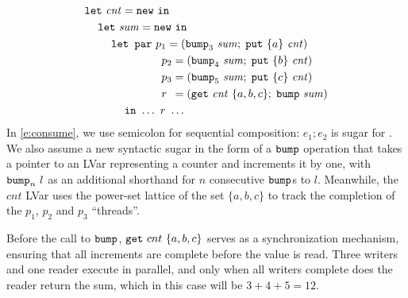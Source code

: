 \begin{equation}\label{e:consume}
\begin{split}
& \letexp{\mathit{cnt}}{\NEW}{ \\
& \letspace \letexp{\mathit{sum}}{\NEW}{ \\
& \letspace \letspace \LETPAR      ~p_1 = (\BUMP_3~{\mathit{sum}};\; \PUT ~ \{a\} ~ \mathit{cnt})\\
& \letspace \letspace \letparspace ~p_2 = (\BUMP_4~{\mathit{sum}};\; \PUT ~ \{b\} ~ \mathit{cnt})\\
& \letspace \letspace \letparspace ~p_3 = (\BUMP_5~{\mathit{sum}};\; \PUT ~ \{c\} ~ \mathit{cnt})\\
& \letspace \letspace \letparspace ~r  \hspace{0.47em} = (\getexp{\mathit{cnt}}\{a,b,c\};\; \bumpexp{\mathit{sum}})\\
& \letspace \letspace \letspace \IN~ \dots~r~\dots
}}
\end{split}
\end{equation}
In \eqref{e:consume},
we use semicolon for sequential composition: $e_1; e_2$ is sugar for .
We also assume a new syntactic sugar in
the form of a $\mbox{\texttt{bump}}$ operation that takes a pointer to an LVar representing a counter and increments it by one,
with $\mbox{\texttt{bump}}_n~l$ as an additional shorthand for $n$ consecutive
$\mbox{\texttt{bump}}$s to $l$.
Meanwhile, the $\mathit{cnt}$ LVar uses the power-set lattice of the set $\{a,b,c\}$ to track the completion
of the $p_1$, $p_2$ and $p_3$ ``threads''.


Before the call to $\mbox{\texttt{bump}}$, $\mbox{\texttt{get}}~cnt~\{a,b,c\}$ serves
as a synchronization mechanism, ensuring that all increments are
complete before the value is read.
Three writers and one reader execute in parallel, and only
when all writers complete does the reader return the sum,
which in this case will be $3 + 4 + 5 = 12$.
%

